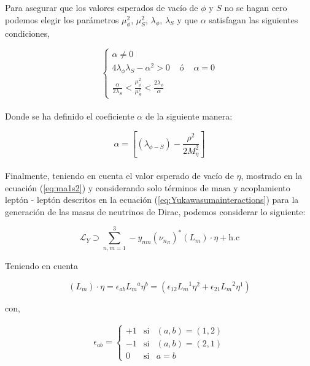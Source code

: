 \documentclass[12pt]{article}
\begin{document}
Para asegurar que los valores esperados de vacío de $\phi$ y $S$ no se hagan cero podemos elegir los parámetros $ \mu^{2}_\phi $, $\mu^{2}_S$, $\lambda_\phi$, $\lambda_S$ y que $\alpha $ satisfagan las siguientes condiciones,

\begin{equation}
    \label{eq:condictions}
      \left \{ \begin{matrix} \alpha \neq 0 \\ 
4\lambda_\phi\lambda_S-\alpha^{2} > 0 & \mbox{ ó }  & \alpha = 0 \\ 
\frac{\alpha}{2\lambda_S} < \frac{\mu^{2}_\phi}{\mu^{2}_S} < \frac{2\lambda_\phi}{\alpha}  
\end{matrix}\right. 
\end{equation} \\



Donde se ha definido el coeficiente $\alpha$ de la siguiente manera: 

\begin{equation}
  \label{eq:alpha}
  \alpha= [({\lambda_{\phi-S}})-\frac{\rho^{2}}{2M^{2}_\eta}]
\end{equation} \\
 
Finalmente, teniendo en cuenta el valor esperado de vacío de $\eta$, mostrado en la ecuación (\ref{eq:ma1s2}) y considerando solo términos de masa y acoplamiento leptón - leptón descritos en la ecuación (\ref{eq:Yukawasumainteractions}) para la generación de las masas de neutrinos de Dirac, podemos considerar lo siguiente:



\begin{equation}
    \label{eq:YukawaLAgran}
    \mathcal{L}_Y \supset    \sum_{n,m=1}^3 -y_{nm} ({\nu_{n_R}})^* ({L_m})\cdot \eta+ \text{h.c}
\end{equation}

Teniendo en cuenta


\[({L_m})\cdot \eta= \epsilon_{ab}{L_m}^a \eta^b = ( \epsilon_{12}{L_m}^1 \eta^2 + \epsilon_{21}{L_m}^2 \eta^1 ) \]

con, 


\begin{equation}
\begin{aligned}
 \label{eq:Levi-Civita}
    \epsilon_{ab} = \left \{  \begin{matrix} +1 & \text{si} & (a,b) =  (1,2) \\
    -1 & \text{si} & (a,b) =  (2,1) \\
    0 & \text{si} & a = b  
    \end{matrix}\right.
\end{aligned}
\end{equation}
\end{document}
